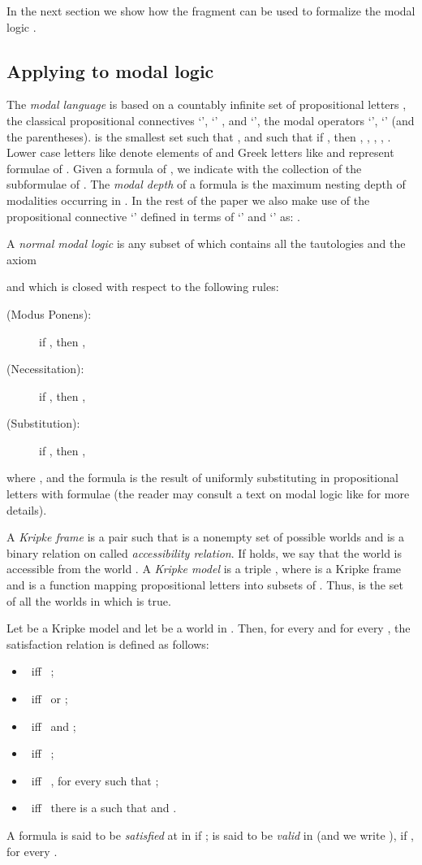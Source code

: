 \documentclass{fundam}
\begin{document}
In the next section we show how the fragment  can be used
to formalize the modal logic .

\subsection{Applying  to modal logic}
The \emph{modal language}  is based on a countably
infinite set of propositional letters , the classical propositional connectives `',
`' , and `', the modal operators `', `'
(and the parentheses).   is the smallest set such that
, and such that if
, then , , , , .  Lower case letters like  denote elements of
 and Greek letters like  and  represent
formulae of .  Given a formula  of
, we indicate with  the collection of
the subformulae of .  The \emph{modal depth} of a formula
 is the maximum nesting depth of modalities occurring in
. In the rest of the paper we also make use of the propositional connective `' defined in terms of
`' and `' as: .



A \emph{normal modal logic}  is any subset of 
which contains all the tautologies and the axiom

and which is closed with respect to the following rules:
\begin{description}
\item [(Modus Ponens):] if , then ,
\item [(Necessitation):] if , then ,
\item [(Substitution):] if , then ,
\end{description}
where , and the formula  is the result of uniformly substituting in  propositional letters with formulae (the reader may consult a text on modal logic like \cite{ModLog01} for more details).

A \emph{Kripke frame} is a pair  such that  is
a nonempty set of possible worlds and  is a binary relation on 
called \emph{accessibility relation}.  If  holds, we say that
the world  is accessible from the world .  A \emph{Kripke model}
is a triple , where  is a
Kripke frame and  is a function mapping propositional letters into
subsets of .  Thus,  is the set of all the worlds in which
 is true.

Let  be a Kripke model and let  be a
world in . Then, for every  and for every
, the satisfaction relation
 is defined as follows:
\begin{itemize}
\item  ~iff~ ;

\item  ~iff~  or ;

\item  ~iff~  and ;

\item  ~iff~ ;

\item  ~iff~ ,
for every  such that ;

\item  ~iff~ there is a  such that  and .
\end{itemize}
A formula  is said to be \emph{satisfied} at  in  if
;  is said to be \emph{valid} in
 (and we write ), if , for every .
\end{document}
